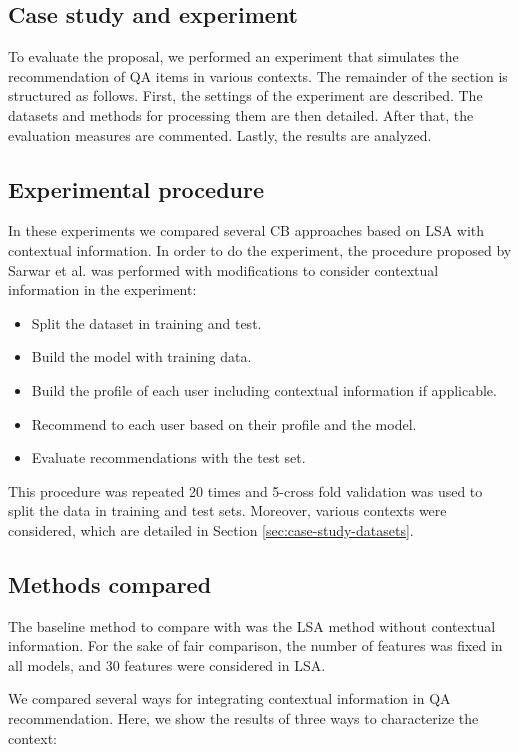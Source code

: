 \documentclass[preprint]{elsarticle}
\begin{document}
\begin{spacing}{1.5}
\section{Case study and experiment}
\label{sec:case-study}

To evaluate the proposal, we performed an experiment that simulates the recommendation of QA items in various contexts. The remainder of the section is structured as follows. First, the settings of the experiment are described. The datasets and methods for processing them are then detailed. After that, the evaluation measures are commented. Lastly, the results are analyzed.

\subsection{Experimental procedure}

In these experiments we compared several CB approaches based on LSA with contextual information. In order to do the experiment, the procedure proposed by Sarwar et al. \cite{Sarwar2001}  was performed with modifications to consider contextual information in the experiment:
\begin{itemize}
	\item Split the dataset in training and test.
	\item Build the model with training data.
	\item Build the profile of each user including contextual information if applicable.
	\item Recommend to each user based on their profile and the model.
	\item Evaluate recommendations with the test set.
\end{itemize}

This procedure was repeated 20 times and 5-cross fold validation was used to split the data in training and test sets. Moreover, various contexts were considered, which are detailed in Section \ref{sec:case-study-datasets}.

\subsection{Methods compared}

The baseline method to compare with was the LSA method without contextual information. For the sake of fair comparison, the number of features was fixed in all models, and 30 features were considered in LSA.

We compared several ways for integrating contextual information in QA recommendation. Here, we show the results of three ways to characterize the context:


\end{spacing}
\end{document}
